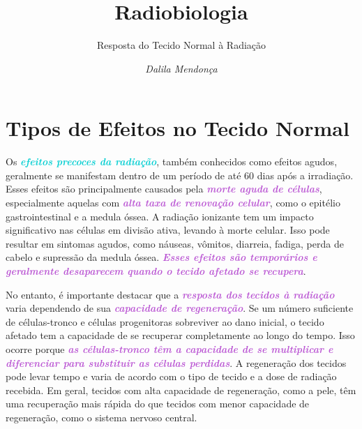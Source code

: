 \documentclass[11pt,a4paper]{article}
\title{\LobsterTwo\Huge{Radiobiologia}}
\author{\LobsterTwo\Large{Resposta do Tecido Normal à Radiação}\nocite{*}}
\date{\LobsterTwo\textit{Dalila Mendonça}}
\begin{document}
	\maketitle



\section{Tipos de Efeitos no Tecido Normal}

	Os \textcolor{DarkTurquoise}{\textbf{\textit{efeitos precoces da radiação}}}, também conhecidos como efeitos agudos, geralmente se manifestam dentro de um período de até 60 dias após a irradiação. Esses efeitos são principalmente causados pela \textcolor{MediumOrchid}{\textbf{\textit{morte aguda de células}}}, especialmente aquelas com \textcolor{MediumOrchid}{\textbf{\textit{alta taxa de renovação celular}}}, como o epitélio gastrointestinal e a medula óssea. A radiação ionizante tem um impacto significativo nas células em divisão ativa, levando à morte celular. Isso pode resultar em sintomas agudos, como náuseas, vômitos, diarreia, fadiga, perda de cabelo e supressão da medula óssea. \textcolor{MediumOrchid}{\textbf{\textit{Esses efeitos são temporários e geralmente desaparecem quando o tecido afetado se recupera}}}.

	No entanto, é importante destacar que a \textcolor{MediumOrchid}{\textbf{\textit{resposta dos tecidos à radiação}}} varia dependendo de sua \textcolor{MediumOrchid}{\textbf{\textit{capacidade de regeneração}}}. Se um número suficiente de células-tronco e células progenitoras sobreviver ao dano inicial, o tecido afetado tem a capacidade de se recuperar completamente ao longo do tempo. Isso ocorre porque \textcolor{MediumOrchid}{\textbf{\textit{as células-tronco têm a capacidade de se multiplicar e diferenciar para substituir as células perdidas}}}. A regeneração dos tecidos pode levar tempo e varia de acordo com o tipo de tecido e a dose de radiação recebida. Em geral, tecidos com alta capacidade de regeneração, como a pele, têm uma recuperação mais rápida do que tecidos com menor capacidade de regeneração, como o sistema nervoso central.
\end{document}
